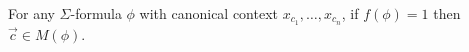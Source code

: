 
  
\begin{lemma} For any $\Sigma$-formula $\phi$ with canonical context
   $x_{c_1},\dots ,x_{c_n}$, if $f(\phi )=1$ then
  $\vec{c}\in M(\phi )$.  \end{lemma}


